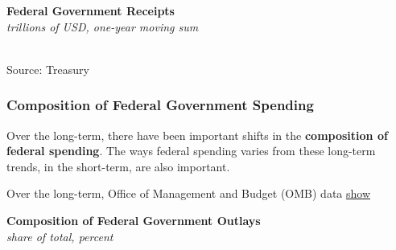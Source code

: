 \documentclass{report}
\makeatletter
\newcommand{\tbllink}[1]{\href{https://raw.githubusercontent.com/bdecon/US-chartbook/master/chartbook/data/#1}{\faTable}}
\newcommand*\short[1]{\expandafter\@gobbletwo\number\numexpr#1\relax}
\newcommand{\absnode}[3]{\node[below right, align=left] at (axis cs: #1,#2) {#3};}
\newcommand{\ltdateaxisticks}{
		date coordinates in=x, axis line style={draw=none},
		xmax={2022-10-31},
		max space between ticks=40,	    
		xtick={{2013-01-01}, {2014-01-01}, {2015-01-01}, {2016-01-01}, {2017-01-01}, {2018-01-01}, 
		    {2019-01-01}, {2020-01-01}, {2021-01-01}, {2022-01-01}},
		enlarge y limits={0.06}, enlarge x limits={0.01},
		}
\newcommand{\bbar}[2]{extra #1 ticks = {{#2}}, extra #1 tick labels = ,
		extra #1 tick style = {grid=major, grid style={thick, black!25}},}
\newcommand{\stdline}[4]{\addplot[very thick, no markers, color=#1] 
		table [x=#2, y=#3, col sep=comma] {#4};	}
\newcommand{\rbar}{
		\fill[color=black!10] (axis cs:{2020-02-01},\pgfkeysvalueof{/pgfplots/ymin}) rectangle 
			(axis cs:{2020-05-01}, \pgfkeysvalueof{/pgfplots/ymax});}
\makeatother
\begin{document}
{\begin{minipage}{0.76\textwidth}
\small 
\end{minipage}  
\vspace{1mm}

\begin{minipage}{0.38\textwidth}
\normalsize \textbf{Federal Government Receipts}\\
\footnotesize{\textit{trillions of USD, one-year moving sum}}\\
\hspace*{-2mm} \\
\footnotesize{Source: Treasury} \hfill \tbllink{tmb_rec.csv}
\end{minipage}
\newpage
\begin{minipage}{0.76\textwidth}
\subsubsection*{Composition of Federal Government Spending}
\small Over the long-term, there have been important shifts in the \textbf{composition of federal spending}. The ways federal spending varies from these long-term trends, in the short-term, are also important. 

Over the long-term, Office of Management and Budget (OMB) data \href{https://www.whitehouse.gov/omb/historical-tables/}{show} 
\vspace{1mm}

\normalsize \textbf{Composition of Federal Government Outlays}\\
\footnotesize{\textit{share of total, percent}}
\vspace{1mm}


\end{minipage}}
\end{document}
